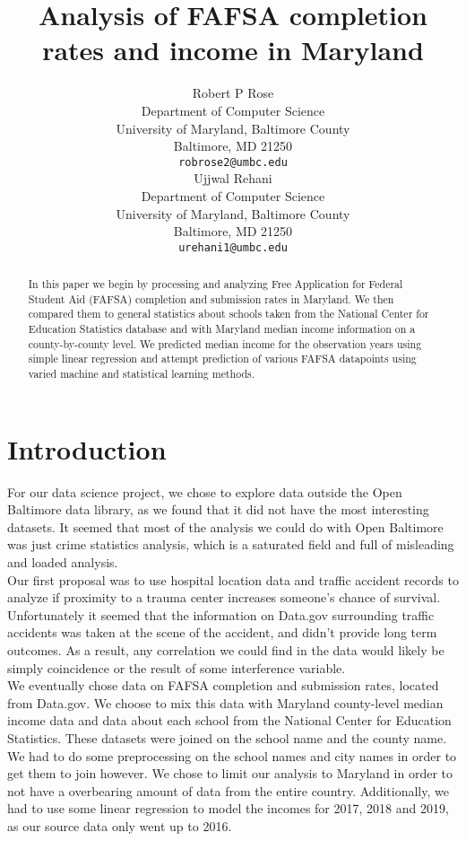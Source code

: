 \documentclass[12pt]{article}
\title{Analysis of FAFSA completion rates and income in Maryland}
\author{
  Robert P Rose \\
  Department of Computer Science\\
  University of Maryland, Baltimore County\\
  Baltimore, MD 21250 \\
  \texttt{robrose2@umbc.edu} \\
   \And
  Ujjwal Rehani \\
  Department of Computer Science\\
  University of Maryland, Baltimore County\\
  Baltimore, MD 21250 \\
  \texttt{urehani1@umbc.edu} \\
}
\begin{document}
\maketitle

\begin{abstract}
In this paper we begin by processing and analyzing Free Application for Federal
Student Aid (FAFSA) completion and submission rates in Maryland. We then compared them to 
general statistics about schools taken from the National Center for Education 
Statistics database and with Maryland median income information on a 
county-by-county level. We predicted median income for the observation years using 
simple linear regression and attempt prediction of various FAFSA datapoints using 
varied machine and statistical learning methods. \\
\end{abstract}

\section{Introduction}
For our data science project, we chose to explore data outside the Open Baltimore
data library, as we found that it did not have the most interesting datasets. It
seemed that most of the analysis we could do with Open Baltimore was just crime
statistics analysis, which is a saturated field and full of misleading and 
loaded analysis.\cite{weatherburn2011} \\

Our first proposal was to use hospital location data and traffic accident records
to analyze if proximity to a trauma center increases someone's chance of survival.
Unfortunately it seemed that the information on Data.gov surrounding traffic
accidents was taken at the scene of the accident, and didn't provide long term
outcomes. As a result, any correlation we could find in the data would likely be
simply coincidence or the result of some interference variable. \\

We eventually chose data on FAFSA completion and submission rates, located from
Data.gov.\cite{fafsa2019} We choose to mix this data with Maryland county-level
median income  data and data about each school from the National Center for 
Education Statistics.\cite{nces2019} These datasets were joined on the school 
name and the county name. We had to do some preprocessing on the school names
and city names in order to get them to join however. We chose to limit our 
analysis to Maryland in order to not have a overbearing amount of data from the 
entire country. Additionally, we had to use some linear regression to model the 
incomes for 2017, 2018 and 2019, as our source data only went up to 2016.\\
\end{document}
